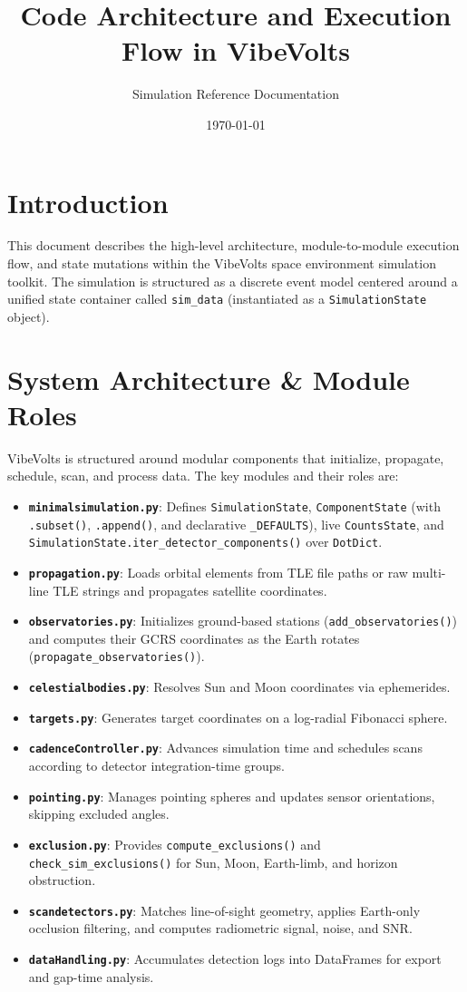 \documentclass[11pt,a4paper]{article}
\title{Code Architecture and Execution Flow in VibeVolts}
\author{Simulation Reference Documentation}
\date{\today}
\begin{document}
\maketitle

\section{Introduction}
This document describes the high-level architecture, module-to-module execution flow, and state
mutations within the VibeVolts space environment simulation toolkit. The simulation is structured as
a discrete event model centered around a unified state container called \texttt{sim\_data}
(instantiated as a \texttt{SimulationState} object).

\section{System Architecture \& Module Roles}
VibeVolts is structured around modular components that initialize, propagate, schedule, scan, and
process data. The key modules and their roles are:

\begin{itemize}
    \item \textbf{\texttt{minimalsimulation.py}}: Defines \texttt{SimulationState},
    \texttt{ComponentState} (with \texttt{.subset()}, \texttt{.append()}, and declarative
    \texttt{\_DEFAULTS}), live \texttt{CountsState}, and
    \texttt{SimulationState.iter\_detector\_components()} over \texttt{DotDict}.
    \item \textbf{\texttt{propagation.py}}: Loads orbital elements from TLE file paths or raw
    multi-line TLE strings and propagates satellite coordinates.
    \item \textbf{\texttt{observatories.py}}: Initializes ground-based stations
    (\texttt{add\_observatories()}) and computes their GCRS coordinates as the Earth rotates
    (\texttt{propagate\_observatories()}).
    \item \textbf{\texttt{celestialbodies.py}}: Resolves Sun and Moon coordinates via ephemerides.
    \item \textbf{\texttt{targets.py}}: Generates target coordinates on a log-radial Fibonacci
    sphere.
    \item \textbf{\texttt{cadenceController.py}}: Advances simulation time and schedules scans
    according to detector integration-time groups.
    \item \textbf{\texttt{pointing.py}}: Manages pointing spheres and updates sensor orientations,
    skipping excluded angles.
    \item \textbf{\texttt{exclusion.py}}: Provides \texttt{compute\_exclusions()} and
    \texttt{check\_sim\_exclusions()} for Sun, Moon, Earth-limb, and horizon obstruction.
    \item \textbf{\texttt{scandetectors.py}}: Matches line-of-sight geometry, applies Earth-only
    occlusion filtering, and computes radiometric signal, noise, and SNR.
    \item \textbf{\texttt{dataHandling.py}}: Accumulates detection logs into DataFrames for export
    and gap-time analysis.
\end{itemize}
\end{document}
